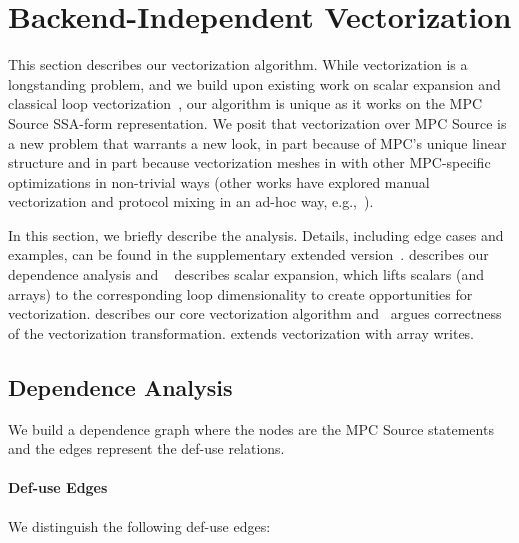 
\section{Backend-Independent Vectorization}
\label{sec:vectorization}


This section describes our vectorization algorithm. While vectorization is a longstanding problem, 
and we build upon existing work on scalar expansion and classical loop vectorization~\cite{Allen:1987}, 
our algorithm is unique as it works on the MPC Source SSA-form representation. We posit that vectorization 
over MPC Source is a new problem that warrants a new look, in part because of MPC's unique linear 
structure and in part because vectorization meshes in with other MPC-specific optimizations in non-trivial ways
(other works have explored manual vectorization and protocol mixing in an ad-hoc way, e.g.,~\cite{NDSS:DemSchZoh15,CCS:BDKKS18,Ishaq:2019}).

In this section, we briefly describe the analysis. Details, including edge cases and examples, can be found in the supplementary extended version~\cite{Anon_TR}.
 describes our dependence analysis and ~ describes scalar expansion,
which lifts scalars (and arrays) to the corresponding loop dimensionality to create opportunities for vectorization. 
 describes our core vectorization algorithm and~ argues correctness of the vectorization transformation.
 extends vectorization with array writes.   

\subsection{Dependence Analysis}
\label{sec:dependence}

We build a dependence graph where the nodes are the MPC Source statements and the edges represent the def-use relations.

\paragraph{Def-use Edges} We distinguish the following def-use edges:

